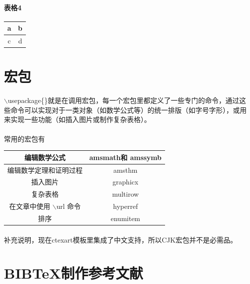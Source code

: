 \documentclass{ctexart}
\begin{document}
    \paragraph{表格4}
    \begin{center}
    \begin{tabular}{|c|c|}
    \hline
    a & b \\
    \hline
    c &d \\
    \hline
    \end{tabular}
    \end{center}

    \section{宏包}
    \paragraph{} $\backslash$usepackage\{\}就是在调用宏包，每一个宏包里都定义了一些专门的命令，通过这些命令可以实现对于一类对象（如数学公式等）的统一排版（如字号字形），或用来实现一些功能（如插入图片或制作复杂表格）。
    \paragraph{} 常用的宏包有
    \begin{center}
    \begin{tabular}{|c|c|}
    \hline
    编辑数学公式& amsmath和 amssymb \\
    \hline
    编辑数学定理和证明过程 & amsthm \\
    \hline
    插入图片 & graphicx \\
    \hline
    复杂表格 & multirow \\
    \hline
    在文章中使用 $\backslash$url 命令\cite{引用网络资源} & hyperref \\
    \hline
    排序 & enumitem \\
    \hline
    \end{tabular}
    \end{center}

     \paragraph{} 补充说明，现在ctexart模板里集成了中文支持，所以CJK宏包并不是必需品。
    

    \section{BIBTeX制作参考文献}
\end{document}
